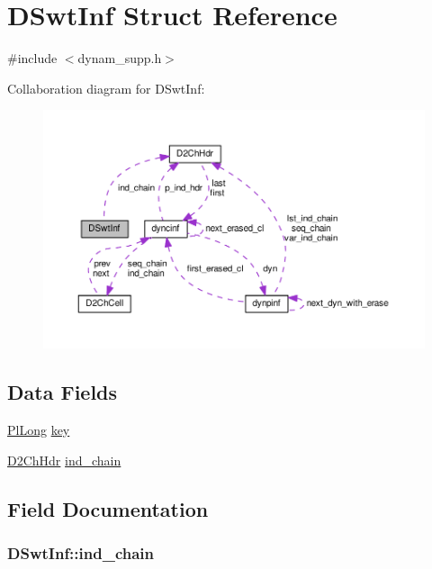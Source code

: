 \hypertarget{structDSwtInf}{}\section{D\+Swt\+Inf Struct Reference}
\label{structDSwtInf}


{\ttfamily \#include $<$dynam\+\_\+supp.\+h$>$}



Collaboration diagram for D\+Swt\+Inf\+:\nopagebreak
\begin{figure}[H]
\begin{center}
\leavevmode
\includegraphics[width=350pt]{structDSwtInf__coll__graph}
\end{center}
\end{figure}
\subsection*{Data Fields}
\begin{DoxyCompactItemize}
\item 
\hyperlink{gprolog_8h_a4d005b136d7fb28537eb1815f7868b63}{Pl\+Long} \hyperlink{structDSwtInf_a9661c05b42d3c1c0deb724486fc685b9}{key}
\item 
\hyperlink{structD2ChHdr}{D2\+Ch\+Hdr} \hyperlink{structDSwtInf_aa4386ca4933b9847a0622d980023e4c8}{ind\+\_\+chain}
\end{DoxyCompactItemize}


\subsection{Field Documentation}
\subsubsection[{\texorpdfstring{ind\+\_\+chain}{ind_chain}}]{ D\+Swt\+Inf\+::ind\+\_\+chain}\hypertarget{structDSwtInf_aa4386ca4933b9847a0622d980023e4c8}{}\label{structDSwtInf_aa4386ca4933b9847a0622d980023e4c8}
